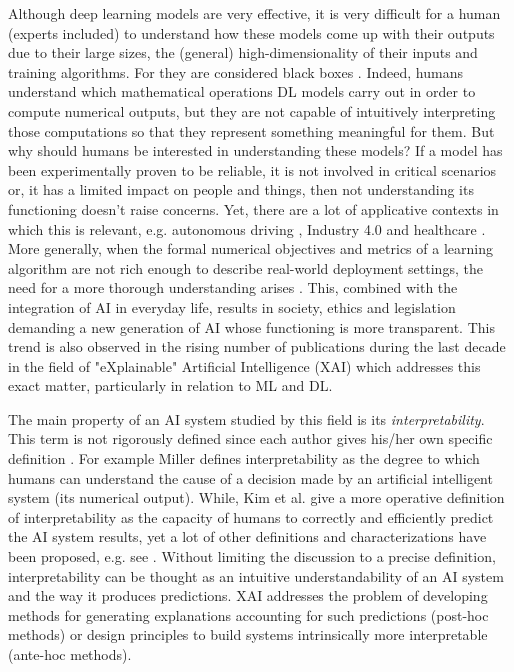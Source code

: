 Although deep learning models are very effective, it is very difficult for a human (experts included) to understand how these models come up with their outputs due to their large sizes, the (general) high-dimensionality of their inputs and training algorithms.
For they are considered black boxes \cite{DL_overview}.
Indeed, humans understand which mathematical operations DL models carry out in order to compute numerical outputs, but they are not capable of intuitively interpreting those computations so that they represent something meaningful for them.
But why should humans be interested in understanding these models? 
If a model has been experimentally proven to be reliable, it is not involved in critical scenarios or, it has a limited impact on people and things, then not understanding its functioning doesn't raise concerns.
Yet, there are a lot of applicative contexts in which this is relevant, e.g. autonomous driving \cite{Zablocki2022}, Industry 4.0 \cite{XAI_industry} and healthcare \cite{XAI_healthcare}.
More generally, when the formal numerical objectives and metrics of a learning algorithm are not rich enough to describe real-world deployment settings, the need for a more thorough understanding arises \cite{Lipton}.
This, combined with the integration of AI in everyday life, results in society, ethics and legislation demanding a new generation of AI whose functioning is more transparent.
This trend is also observed in the rising number of publications during the last decade \cite{XAI_review} in the field of "eXplainable" Artificial Intelligence (XAI) which addresses this exact matter, particularly in relation to ML and DL.

The main property of an AI system studied by this field is its \textit{interpretability}.
This term is not rigorously defined since each author gives his/her own specific definition \cite{XAI_review}.
For example Miller \cite{Miller} defines interpretability as the degree to which humans can understand the cause of a decision made by an artificial intelligent system (its numerical output). 
While, Kim et al. \cite{examples_enough} give a more operative definition of interpretability as the capacity of humans to correctly and efficiently predict the AI system results, yet a lot of other definitions and characterizations have been proposed, e.g. see \cite{Lipton}.
Without limiting the discussion to a precise definition, interpretability can be thought as an intuitive understandability of an AI system and the way it produces predictions.
XAI addresses the problem of developing methods for generating explanations accounting for such predictions (post-hoc methods) or design principles to build systems intrinsically more interpretable (ante-hoc methods).

